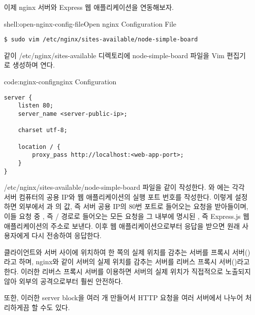 이제 nginx 서버와 Express 웹 애플리케이션을 연동해보자.

\begin{shellenv}{shell:open-nginx-config-file}{Open nginx Configuration File}\begin{verbatim}
$ sudo vim /etc/nginx/sites-available/node-simple-board
\end{verbatim}
\end{shellenv}

\과 같이 /etc/nginx/sites-available 디렉토리에 node-simple-board 파일을 Vim 편집기로 생성하며 연다.

\begin{codeenv}{code:nginx-config}{nginx Configuration}\begin{verbatim}
server {
    listen 80;
    server_name <server-public-ip>;

    charset utf-8;

    location / {
        proxy_pass http://localhost:<web-app-port>;
    }
}
\end{verbatim}
\end{codeenv}

/etc/nginx/sites-available/node-simple-board 파일을 \와 같이 작성한다. 와 에는 각각 서버 컴퓨터의 공용 IP와 웹 애플리케이션의 실행 포트 번호를 작성한다. 이렇게 설정하면 외부에서 과 의 값, 즉 서버 공용 IP의 80번 포트로 들어오는 요청을 받아들이며, 이들 요청 중 , 즉 / 경로로 들어오는 모든 요청을 그 내부에 명시된 , 즉 Express.js 웹 애플리케이션의 주소로 보낸다. 이후 웹 애플리케이션으로부터 응답을 받으면 원래 사용자에게 다시 전송하여 응답한다.


클라이언트와 서버 사이에 위치하여 한 쪽의 실제 위치를 감추는 서버를 프록시 서버()라고 하며, nginx와 같이 서버의 실제 위치를 감추는 서버를 리버스 프록시 서버()라고 한다. 이러한 리버스 프록시 서버를 이용하면 서버의 실제 위치가 직접적으로 노출되지 않아 외부의 공격으로부터 훨씬 안전하다.

또한, 이러한 server block을 여러 개 만들어서 HTTP 요청을 여러 서버에서 나누어 처리하게끔 할 수도 있다.

